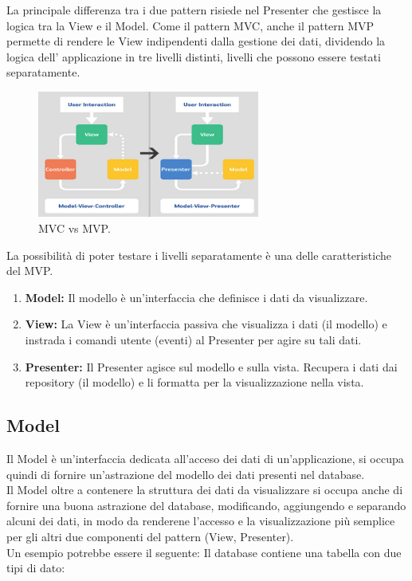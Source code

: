 La principale differenza tra i due pattern risiede nel Presenter che gestisce la logica tra la View e il Model.
Come il pattern MVC, anche il pattern MVP permette di rendere le View indipendenti dalla gestione dei dati, dividendo la logica dell' applicazione in tre livelli distinti, livelli che possono essere testati separatamente.
\begin{figure}[!b]
     \centering
     \includegraphics[width=0.65\textwidth]{immagini/mvc-vs-mvp.jpg}
     \caption{MVC vs MVP.}\label{fig:MVC vs MVP}
\end{figure}

\newpage
La possibilità di poter testare i livelli separatamente è una delle caratteristiche del MVP.\@
\begin{enumerate}
   \item \textbf{Model:} Il modello è un'interfaccia che definisce i dati da visualizzare.
   \item \textbf{View:} La View è un'interfaccia passiva che visualizza i dati (il modello) e instrada i comandi utente (eventi) al Presenter per agire su tali dati.
   \item \textbf{Presenter:} Il Presenter agisce sul modello e sulla vista. Recupera i dati dai repository (il modello) e li formatta per la visualizzazione nella vista.
\end{enumerate}




\subsection{Model}
Il Model è un'interfaccia dedicata all'acceso dei dati di un'applicazione, si occupa quindi di fornire un'astrazione del modello dei dati presenti nel database.\\
Il Model oltre a contenere la struttura dei dati da visualizzare si occupa anche di fornire una buona astrazione del database, modificando, aggiungendo e separando alcuni dei dati, in modo da renderene l'accesso e la visualizzazione più semplice per gli altri due componenti del pattern (View, Presenter).\\
Un esempio potrebbe essere il seguente:
Il database contiene una tabella con due tipi di dato:

